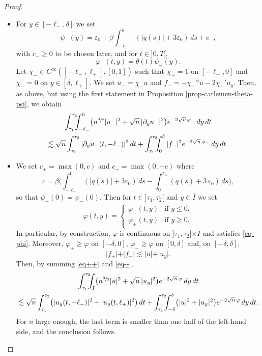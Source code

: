 \documentclass[JEP,XML,SOM,Unicode]{cedram}
\theoremstyle{plain}
\theoremstyle{definition}
\newcommand{\abs}[1]{\vert #1\vert}
\newcommand{\1}{\mathds 1}
\let\d\delta
\let\e\varepsilon
\let\f\varphi
\let\h\chi
\begin{document}
\begin{proof}
\begin{itemize}
\item
For $y \in [-\ell_-,\d]$ we set
\[
\psi_-(y) = \e_0 + \beta \int_{-\ell_-}^y (\abs{q(s)} + 3 \varepsilon_0)\, ds + c_-,
\]
with $c_- \geq 0$ to be chosen later, and for $t \in{}]0,T[$,
\[
\f_-(t,y) = \theta(t) \psi_-(y).
\]
Let $\h_- \in C^\infty([-\ell_-,\ell_+],[0,1])$ such that $\h_- = 1$ on $[-\ell_-,0]$ and $\h_- = 0$ on $y \in [\d,\ell_+]$. We set $u_- = \h_- u$ and $f_- = -\h_-'' u - 2 \h_-' u_y$. Then, as above, but using the first statement in Proposition \ref{prop-carlemen-theta-psi}, we obtain
\begin{multline} \label{eq--}
\int_{\tau_1}^{\tau_2}\hspace*{-2mm} \int_{-\ell_-}^0 \bigl(n^{\sfrac 32} \abs {u_-}^2 + \sqrt n\,\abs{\partial_y u_-}^2 \bigr) e^{- 2 \sqrt n\,\f_-} \, dy \, dt\\
\lesssim \sqrt n \int_{\tau_1}^{\tau_2} \abs{\partial_y u_-(t,-\ell_-)}^2 \, dt + \int_{\tau_1}^{\tau_2}\hspace*{-2mm} \int_0^\d \abs {f_-}^2 e^{-2\sqrt n\,\f_-} \, dy \, dt.
\end{multline}

\item
We set $c_+ = \max(0,c)$ and $c_- = \max(0,-c)$ where
\[
c = \beta \biggl(\int_{-\ell_-}^0 (\abs{q(s)} + 3\e_0)\, ds - \int_0^{\ell_+}(q(s) + 3\, \e_0)\,ds \biggr),
\]
so that $\psi_+(0) = \psi_-(0)$. Then for $t \in{}]\tau_1,\tau_2[$ and $y \in \bar I$ we set
\[
\f(t,y) =
\begin{cases}
\f_-(t,y) & \text{if } y \leq 0,\\
\f_+(t,y) & \text{if } y \geq 0.
\end{cases}
\]
In particular, by construction, $\f$ is continuous on $]\tau_1,\tau_2[\times \bar I$ and satisfies \eqref{eq-phi}. Moreover, $\f_+ \geq \f$ on $[-\d,0]$, $\f_- \geq \f$ on $[0,\d]$ and, on $[-\d,\d]$,
\[
\abs{f_+} + \abs {f_-} \lesssim \abs {u} + \abs{u_y}.
\]
Then, by summing \eqref{eq++} and \eqref{eq--},
\begin{multline*}
\int_{\tau_1}^{\tau_2}\hspace*{-2mm} \int_{I} \bigl(n^{\sfrac 32} \abs u^2 + \sqrt n\,\abs{u_y}^2 \bigr) e^{-2 \sqrt n\,\f} \, dy \, dt\\
\lesssim \sqrt n \int_{\tau_1}^{\tau_2} \bigl(\abs{u_y(t,-\ell_-)}^2 + \abs{u_y(t,\ell_+)}^2 \bigr) \, dt + \int_{\tau_1}^{\tau_2}\hspace*{-2mm} \int_{-\d}^\d \bigl(\abs u^2 + \abs{u_y}^2\bigr) e^{-2\sqrt n\,\f} \, dy \, dt.
\end{multline*}
For $n$ large enough, the last term is smaller than one half of the left-hand side, and the conclusion follows.\qedhere
\end{itemize}
\end{proof}
\end{document}
